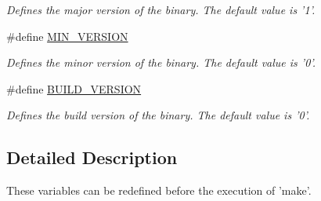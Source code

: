 \begin{DoxyCompactItemize}
\begin{DoxyCompactList}\small\item\em Defines the major version of the binary. The default value is '1'. \end{DoxyCompactList}\item 
\hypertarget{group___build___variables_gabcd45341369f87e7ad5dfefee97c6811}{\#define \hyperlink{group___build___variables_gabcd45341369f87e7ad5dfefee97c6811}{M\+I\+N\+\_\+\+V\+E\+R\+S\+I\+O\+N}}\label{group___build___variables_gabcd45341369f87e7ad5dfefee97c6811}

\begin{DoxyCompactList}\small\item\em Defines the minor version of the binary. The default value is '0'. \end{DoxyCompactList}\item 
\hypertarget{group___build___variables_gad7a967dd260384e94010b31b1412a0b4}{\#define \hyperlink{group___build___variables_gad7a967dd260384e94010b31b1412a0b4}{B\+U\+I\+L\+D\+\_\+\+V\+E\+R\+S\+I\+O\+N}}\label{group___build___variables_gad7a967dd260384e94010b31b1412a0b4}

\begin{DoxyCompactList}\small\item\em Defines the build version of the binary. The default value is '0'. \end{DoxyCompactList}\end{DoxyCompactItemize}


\subsection{Detailed Description}
These variables can be redefined before the execution of 'make'. 


